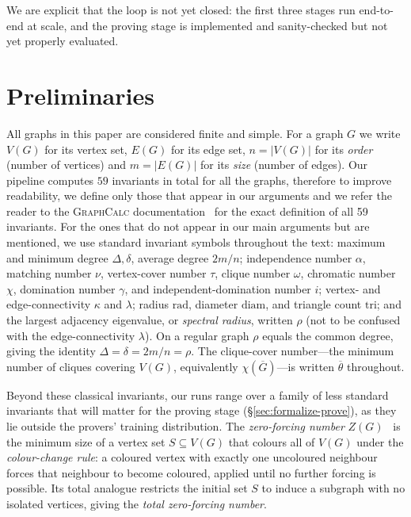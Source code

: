 \documentclass[]{ceurart}
\begin{document}
We are explicit that the loop is not yet closed: the first three stages run end-to-end at scale, and the proving stage is implemented and sanity-checked but not yet properly evaluated.

\section{Preliminaries}
\label{sec:preliminaries}

All graphs in this paper are considered finite and simple. For a graph $G$ we write $V(G)$ for its vertex set, $E(G)$ for its edge set, $n=|V(G)|$ for its \emph{order} (number of vertices) and $m=|E(G)|$ for its
\emph{size} (number of edges).  Our pipeline computes $59$ invariants in total for all the graphs, therefore to improve readability, we define only those that appear in our arguments and we
refer the reader to the \textsc{GraphCalc} documentation~\cite{davila2025graphcalc} for the exact definition of all 59 invariants. For the ones that do not appear in our main arguments but are mentioned, we use standard invariant symbols throughout the text: maximum and minimum degree $\Delta,\delta$, average degree $2m/n$;
independence number $\alpha$, matching number $\nu$,
vertex-cover number $\tau$, clique number $\omega$, chromatic number $\chi$,
domination number $\gamma$, and independent-domination
number $i$; vertex- and edge-connectivity $\kappa$ and $\lambda$; radius
$\mathrm{rad}$, diameter $\mathrm{diam}$, and triangle count $\mathrm{tri}$; and
the largest adjacency eigenvalue, or \emph{spectral radius}, written $\rho$
(not to be confused with the edge-connectivity $\lambda$). On a regular graph $\rho$ equals the common degree, giving the identity
$\Delta=\delta=2m/n=\rho$. The clique-cover number---the minimum number of
cliques covering $V(G)$, equivalently $\chi(\overline G)$---is written
$\overline{\theta}$ throughout. 

Beyond these classical invariants, our runs range over a family of less standard invariants that
will matter for the proving stage (\S\ref{sec:formalize-prove}), as they lie outside the provers'
training distribution. The \emph{zero-forcing number} $Z(G)$~\cite{aim2008zeroforcing} is the minimum size of a vertex set
$S\subseteq V(G)$ that colours all of $V(G)$ under the \emph{colour-change rule}: a coloured vertex
with exactly one uncoloured neighbour forces that neighbour to become coloured, applied until no
further forcing is possible. Its total analogue restricts the initial set $S$ to induce a subgraph with no isolated vertices, giving the \emph{total zero-forcing number}. 
\end{document}
